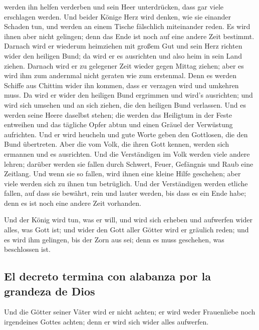 werden ihn helfen verderben und sein Heer unterdrücken, dass gar viele
erschlagen werden.  Und beider Könige Herz wird denken,
wie sie einander Schaden tun, und werden an einem Tische fälschlich
miteinander reden. Es wird ihnen aber nicht gelingen; denn das Ende ist
noch auf eine andere Zeit bestimmt.  Darnach wird er
wiederum heimziehen mit großem Gut und sein Herz richten wider den
heiligen Bund; da wird er es ausrichten und also heim in sein Land
ziehen.  Darnach wird er zu gelegener Zeit wieder gegen
Mittag ziehen; aber es wird ihm zum andernmal nicht geraten wie zum
erstenmal.  Denn es werden Schiffe aus Chittim wider ihn
kommen, dass er verzagen wird und umkehren muss. Da wird er wider den
heiligen Bund ergrimmen und wird's ausrichten; und wird sich umsehen und
an sich ziehen, die den heiligen Bund verlassen.  Und es
werden seine Heere daselbst stehen; die werden das Heiligtum in der
Feste entweihen und das tägliche Opfer abtun und einen Gräuel der
Verwüstung aufrichten.  Und er wird heucheln und gute
Worte geben den Gottlosen, die den Bund übertreten. Aber die vom Volk,
die ihren Gott kennen, werden sich ermannen und es ausrichten.
 Und die Verständigen im Volk werden viele andere lehren;
darüber werden sie fallen durch Schwert, Feuer, Gefängnis und Raub eine
Zeitlang.  Und wenn sie so fallen, wird ihnen eine kleine
Hilfe geschehen; aber viele werden sich zu ihnen tun betrüglich.
 Und der Verständigen werden etliche fallen, auf dass sie
bewährt, rein und lauter werden, bis dass es ein Ende habe; denn es ist
noch eine andere Zeit vorhanden.

 Und der König wird tun, was er will, und wird sich
erheben und aufwerfen wider alles, was Gott ist; und wider den Gott
aller Götter wird er gräulich reden; und es wird ihm gelingen, bis der
Zorn aus sei; denn es muss geschehen, was beschlossen ist.

\hypertarget{el-decreto-termina-con-alabanza-por-la-grandeza-de-dios}{%
\subsection{El decreto termina con alabanza por la grandeza de
Dios}\label{el-decreto-termina-con-alabanza-por-la-grandeza-de-dios}}

 Und die Götter seiner Väter wird er nicht achten; er
wird weder Frauenliebe noch irgendeines Gottes achten; denn er wird sich
wider alles aufwerfen.

